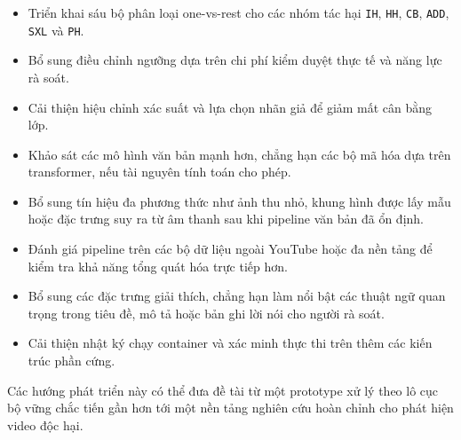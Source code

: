 \begin{itemize}
    \item Triển khai sáu bộ phân loại one-vs-rest cho các nhóm tác hại \texttt{IH}, \texttt{HH}, \texttt{CB}, \texttt{ADD}, \texttt{SXL} và \texttt{PH}.
    \item Bổ sung điều chỉnh ngưỡng dựa trên chi phí kiểm duyệt thực tế và năng lực rà soát.
    \item Cải thiện hiệu chỉnh xác suất và lựa chọn nhãn giả để giảm mất cân bằng lớp.
    \item Khảo sát các mô hình văn bản mạnh hơn, chẳng hạn các bộ mã hóa dựa trên transformer, nếu tài nguyên tính toán cho phép.
    \item Bổ sung tín hiệu đa phương thức như ảnh thu nhỏ, khung hình được lấy mẫu hoặc đặc trưng suy ra từ âm thanh sau khi pipeline văn bản đã ổn định.
    \item Đánh giá pipeline trên các bộ dữ liệu ngoài YouTube hoặc đa nền tảng để kiểm tra khả năng tổng quát hóa trực tiếp hơn.
    \item Bổ sung các đặc trưng giải thích, chẳng hạn làm nổi bật các thuật ngữ quan trọng trong tiêu đề, mô tả hoặc bản ghi lời nói cho người rà soát.
    \item Cải thiện nhật ký chạy container và xác minh thực thi trên thêm các kiến trúc phần cứng.
\end{itemize}

Các hướng phát triển này có thể đưa đề tài từ một prototype xử lý theo lô cục bộ vững chắc tiến gần hơn tới một nền tảng nghiên cứu hoàn chỉnh cho phát hiện video độc hại.
